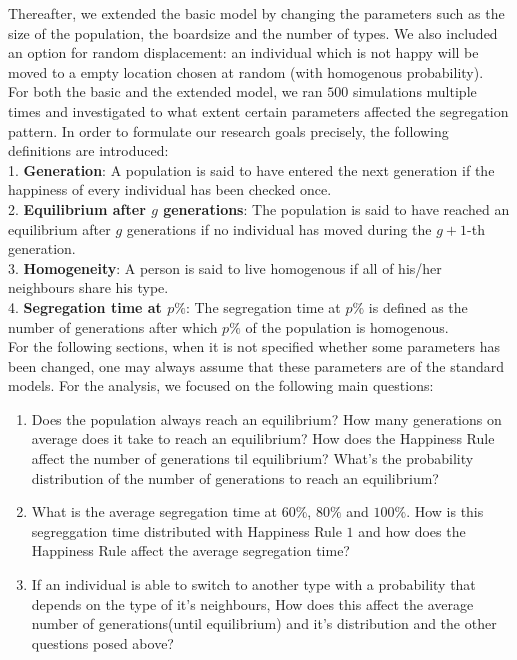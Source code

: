Thereafter, we extended the basic model by changing the parameters such as the size of the population, the boardsize and the number of types. 
We also included an option for random displacement: an individual which is not happy will be moved to a empty location chosen at random (with homogenous probability).\\

For both the basic and the extended model, we ran $500$ simulations multiple times and investigated to what extent certain parameters affected the segregation pattern. 
In order to formulate our research goals precisely, the following definitions are introduced:\\
1. \textbf{Generation}: 
A population is said to have entered the next generation if the happiness of every individual has been checked once. \\
2. \textbf{Equilibrium after \(g\) generations}: 
The population is said to have reached an equilibrium after \(g\) generations if no individual has moved during the \(g+1\)-th generation.\\
3. \textbf{Homogeneity}:
A person is said to live homogenous if all of his/her neighbours share his type.\\
4. \textbf{Segregation time at $p\%$}: 
The segregation time at $p\%$ is defined as the number of generations after which $p\%$ of the population is homogenous.\\

For the following sections, when it is not specified whether some parameters has been changed, one may always assume that these parameters are of the standard models.
\newpage
For the analysis, we focused on the following main questions:
\begin{enumerate}
	\item 	Does the population always reach an equilibrium? 
	How many generations on average does it take to reach an equilibrium? 
	How does the Happiness Rule affect the number of generations til equilibrium? 
	What's the probability distribution of the number of generations to reach an equilibrium?

	\item What is the average segregation time at \(60\%\), \(80\%\) and \(100\%\). 
	How is this segreggation time distributed with Happiness Rule \(1\) and how does the Happiness Rule affect the average segregation time?
	
	\item If an individual is able to switch to another type with a probability that depends on the type of it's neighbours,
	How does this affect the average number of generations(until equilibrium) and it's distribution and the other questions posed above?
\end{enumerate}

